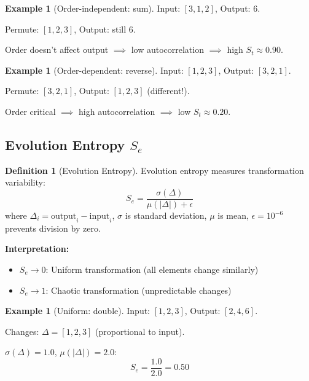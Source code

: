 \documentclass[twocolumn,10pt]{revtex4-2}
\theoremstyle{definition}
\newtheorem{definition}[theorem]{Definition}
\newtheorem{example}[theorem]{Example}
\theoremstyle{remark}
\newcommand{\St}{S_t}
\newcommand{\Se}{S_e}
\begin{document}
\begin{example}[Order-independent: sum]
Input: $[3,1,2]$, Output: $6$.

Permute: $[1,2,3]$, Output: still $6$.

Order doesn't affect output $\implies$ low autocorrelation $\implies$ high $\St \approx 0.90$.
\end{example}

\begin{example}[Order-dependent: reverse]
Input: $[1,2,3]$, Output: $[3,2,1]$.

Permute: $[3,2,1]$, Output: $[1,2,3]$ (different!).

Order critical $\implies$ high autocorrelation $\implies$ low $\St \approx 0.20$.
\end{example}

\subsection{Evolution Entropy $\Se$}

\begin{definition}[Evolution Entropy]
\label{def:evolution_entropy}
Evolution entropy measures transformation variability:
\begin{equation}
\Se = \frac{\sigma(\Delta)}{\mu(|\Delta|) + \epsilon}
\label{eq:evolution_entropy}
\end{equation}
where $\Delta_i = \text{output}_i - \text{input}_i$, $\sigma$ is standard deviation, $\mu$ is mean, $\epsilon = 10^{-6}$ prevents division by zero.
\end{definition}

\noindent\textbf{Interpretation:}
\begin{itemize}
\item $\Se \to 0$: Uniform transformation (all elements change similarly)
\item $\Se \to 1$: Chaotic transformation (unpredictable changes)
\end{itemize}

\begin{example}[Uniform: double]
Input: $[1,2,3]$, Output: $[2,4,6]$.

Changes: $\Delta = [1,2,3]$ (proportional to input).

$\sigma(\Delta) = 1.0$, $\mu(|\Delta|) = 2.0$:
\begin{equation}
\Se = \frac{1.0}{2.0} = 0.50
\end{equation}
\end{example}
\end{document}
